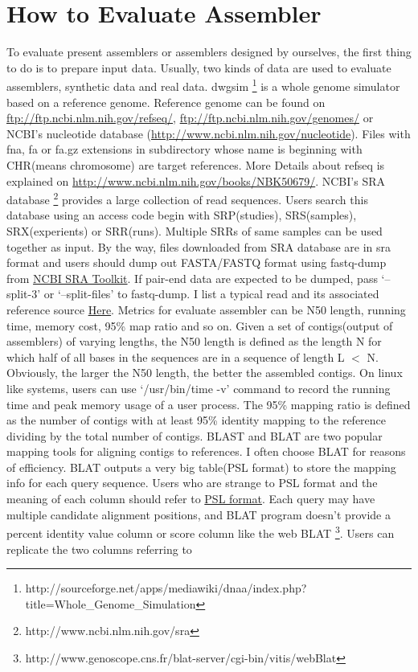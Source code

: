 \documentclass{article}
\begin{document}
\section{How to Evaluate Assembler}
To evaluate present assemblers or assemblers designed by ourselves, the first thing to do is to prepare input data. Usually, two kinds of data are used to evaluate assemblers, synthetic data and real data. dwgsim \footnote{http://sourceforge.net/apps/mediawiki/dnaa/index.php?title=Whole\_Genome\_Simulation} is a whole genome simulator based on a reference genome. Reference genome can be found on \href{ftp://ftp.ncbi.nlm.nih.gov/refseq/}{ftp://ftp.ncbi.nlm.nih.gov/refseq/}, \href{ftp://ftp.ncbi.nlm.nih.gov/genomes/}{ftp://ftp.ncbi.nlm.nih.gov/genomes/} or NCBI's nucleotide database (\href{http://www.ncbi.nlm.nih.gov/nucleotide}{http://www.ncbi.nlm.nih.gov/nucleotide}). Files with fna, fa or fa.gz extensions in subdirectory whose name is beginning with CHR(means chromosome) are target references. More Details about refseq is explained on \href{http://www.ncbi.nlm.nih.gov/books/NBK50679/}{http://www.ncbi.nlm.nih.gov/books/NBK50679/}. NCBI's SRA database \footnote{http://www.ncbi.nlm.nih.gov/sra} provides a large collection of read sequences. Users search this database using an access code begin with SRP(studies), SRS(samples), SRX(experients) or SRR(runs). Multiple SRRs of same samples can be used together as input. By the way, files downloaded from SRA database are in sra format and users should dump out FASTA/FASTQ format using fastq-dump from \href{http://trace.ncbi.nlm.nih.gov/Traces/sra/sra.cgi?view=software}{NCBI SRA Toolkit}. If pair-end data are expected to be dumped, pass `--split-3' or `--split-files' to fastq-dump. I list a typical read and its associated reference source \href{https://github.com/zixiaojindao/RNA-sequence-info/blob/master/dataset.txt}{Here}. Metrics for evaluate assembler can be N50 length, running time, memory cost, 95\% map ratio and so on. Given a set of contigs(output of assemblers) of varying lengths, the N50 length is defined as the length N for which half of all bases in the sequences are in a sequence of length L $<$ N. Obviously, the larger the N50 length, the better the assembled contigs. On linux like systems, users can use `/usr/bin/time -v' command to record the running time and peak memory usage of a user process. The 95\% mapping ratio is defined as the number of contigs with at least 95\% identity mapping to the reference dividing by the total number of contigs. BLAST \cite{altschul1990basic} and BLAT \cite{kent2002blat} are two popular mapping tools for aligning contigs to references. I often choose BLAT for reasons of efficiency. BLAT outputs a very big table(PSL format) to store the mapping info for each query sequence. Users who are strange to PSL format and the meaning of each column should refer to \href{http://genome.ucsc.edu/FAQ/FAQformat.html#format2}{PSL format}. Each query may have multiple candidate alignment positions, and BLAT program doesn't provide a percent identity value column or score column like the web BLAT \footnote{http://www.genoscope.cns.fr/blat-server/cgi-bin/vitis/webBlat}. Users can replicate the two columns referring to 
\end{document}
